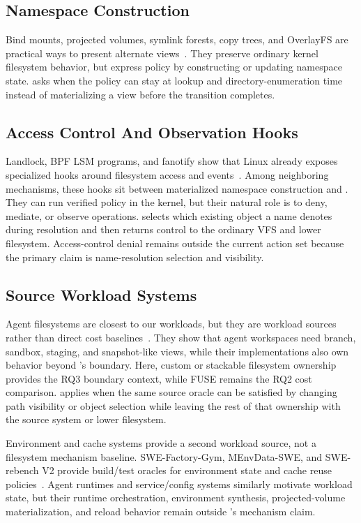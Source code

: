 \subsection{Namespace Construction}

Bind mounts, projected volumes, symlink forests, copy trees, and OverlayFS are
practical ways to present alternate views~\cite{kubernetes_projected_volumes,linux_overlayfs}.
They preserve ordinary kernel filesystem behavior, but express policy by
constructing or updating namespace state. \namei asks when the policy can stay
at lookup and directory-enumeration time instead of materializing a view before
the transition completes.

\subsection{Access Control And Observation Hooks}

Landlock, BPF LSM programs, and fanotify show that Linux already exposes
specialized hooks around filesystem access and events~\cite{linux_landlock,linux_bpf_lsm,linux_fanotify}.
Among neighboring mechanisms, these hooks sit between materialized namespace
construction and \namei. They can run verified policy in the kernel, but their
natural role is to deny, mediate, or observe operations. \namei selects which
existing object a name denotes during resolution and then returns control to the
ordinary VFS and lower filesystem. Access-control denial remains outside the
current action set because the primary claim is name-resolution selection and
visibility.

\subsection{Source Workload Systems}

Agent filesystems are closest to our workloads, but they are workload sources
rather than direct cost baselines~\cite{agentfs_repo,branchfs_repo,sandlock_repo,yolofs_repo}.
They show that agent workspaces need branch, sandbox, staging, and
snapshot-like views, while their implementations also own behavior beyond
\namei's boundary.
Here, custom or stackable filesystem ownership provides the RQ3 boundary
context, while FUSE remains the RQ2 cost comparison. \namei applies when the
same source oracle can be satisfied by changing path visibility or object
selection while leaving the rest of that ownership with the source system or
lower filesystem.

Environment and cache systems provide a second workload source, not a filesystem
mechanism baseline. SWE-Factory-Gym, MEnvData-SWE, and SWE-rebench V2 provide
build/test oracles for environment state and cache reuse
policies~\cite{swe_factory_repo,menvagent_repo,swe_rebench_v2_repo}. Agent
runtimes and service/config systems similarly motivate workload state, but their
runtime orchestration, environment synthesis, projected-volume materialization,
and reload behavior remain outside \namei's mechanism claim.
